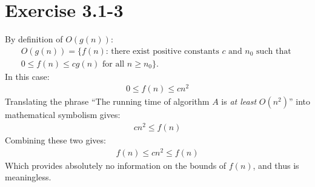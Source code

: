 \documentclass{article}
\begin{document}
\section*{Exercise 3.1-3}

By definition of $O(g(n))$:
\begin{eqnarray*}
	O(g(n)) = \{f(n) \text{: there exist positive constants } c \text{ and } n_0 \text{ such that } \\
	0 \leq f(n) \leq c g(n) \text{ for all } n \geq n_0 \}.
\end{eqnarray*}
In this case:
\begin{eqnarray*}
	0 \leq f(n) \leq c n^2
\end{eqnarray*}
Translating the phrase ``The running time of algorithm $A$ is \textit{at least} $O(n^2)$'' into mathematical symbolism gives:
\begin{eqnarray*}
	c n^2 \leq f(n)
\end{eqnarray*}
Combining these two gives:
\begin{eqnarray*}
	f(n) \leq c n^2 \leq f(n)
\end{eqnarray*}
Which provides absolutely no information on the bounds of $f(n)$, and thus is meaningless.
\end{document}
